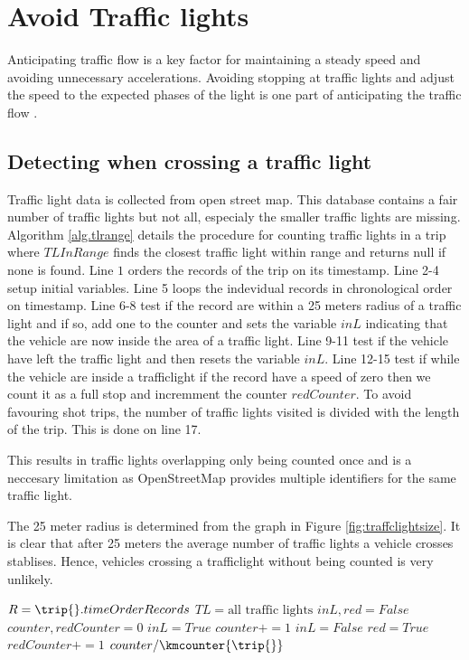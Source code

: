 \section{Avoid Traffic lights}
Anticipating traffic flow is a key factor for maintaining a steady speed and avoiding unnecessary accelerations. 
Avoiding stopping at traffic lights and adjust the speed to the expected phases of the light is one part of anticipating the traffic flow \cite{}. %

\subsection{Detecting when crossing a traffic light}
Traffic light data is collected from open street map. 
This database contains a fair number of traffic lights but not all, especialy the smaller traffic lights are missing.
Algorithm \ref{alg.tlrange} details the procedure for counting traffic lights in a trip where $TLInRange$ finds the closest traffic light within range and returns null if none is found. Line $1$ orders the records of the trip on its timestamp. Line 2-4 setup initial variables. Line 5 loops the indevidual records in chronological order on timestamp. Line 6-8 test if the record are within a 25 meters radius of a traffic light and if so, add one to the counter and sets the variable $inL$ indicating that the vehicle are now inside the area of a traffic light. Line 9-11 test if the vehicle have left the traffic light and then resets the variable $inL$. Line 12-15 test if while the vehicle are inside a trafficlight if the record have a speed of zero then we count it as a full stop and incremment the counter $redCounter$. To avoid favouring shot trips, the number of traffic lights visited is divided with the length of the trip. This is done on line 17.

This results in traffic lights overlapping only being counted once and is a neccesary limitation as OpenStreetMap provides multiple identifiers for the same traffic light.

The 25 meter radius is determined from the graph in Figure \ref{fig:traffclightsize}.
It is clear that after 25 meters the average number of traffic lights a vehicle crosses stablises.
Hence, vehicles crossing a trafficlight without being counted is very unlikely.

\begin{algorithm}
\caption{$countTrafficLights(\trip{})$}\label{alg.tlrange}
\begin{algorithmic}[1]
\State $R = \trip{}.timeOrderRecords$
\State $TL = \mbox{all traffic lights}$
\State $inL, red = False$
\State $counter, redCounter= 0$
	\State $inL = True$
	\State $counter+=1$
	\State $inL = False$
\EndIf
{}
	\State $red = True$
	\State $redCounter+=1$
\EndIf
\EndWhile
\State \Return $ counter / \kmcounter{\trip{}}$

\end{algorithmic}
\end{algorithm}

